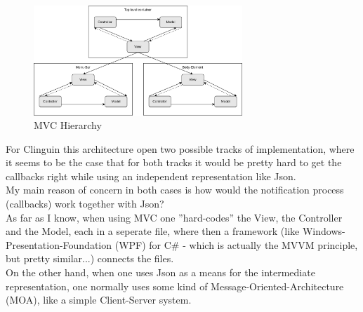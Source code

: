 \documentclass[12pt,a4paper]{article}
\newcommand{\<}[1]{\guilsinglleft}
\renewcommand{\>}[1]{\guilsinglright}
\begin{document}
\begin{figure}[ht]
    \begin{center}
    \includegraphics[width=0.7\textwidth]{imgs/mvc-architecture.png}
    \caption{MVC Hierarchy}
    \label{fig:mvc-hierarchy}
    \end{center}
\end{figure}

\noindent For Clinguin this architecture open two possible tracks of implementation, where it seems to be the case that for both tracks it would be pretty hard to get the callbacks right while using an independent representation like Json.\\[1em]
My main reason of concern in both cases is how would the notification process (callbacks) work together with Json?\\
As far as I know, when using MVC one ''hard-codes'' the View, the Controller and the Model, each in a seperate file, where then a framework (like Windows-Presentation-Foundation (WPF) for C\# - which is actually the MVVM principle, but pretty similar...) connects the files.\\
On the other hand, when one uses Json as a means for the intermediate representation, one normally uses some kind of Message-Oriented-Architecture (MOA), like a simple Client-Server system.\\
\end{document}

